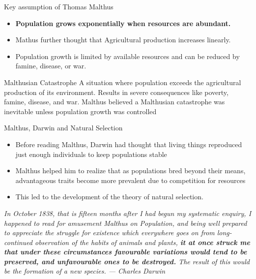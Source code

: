 \begin{frame}{Key assumption of  Thomas Malthus}
\begin{itemize}
    \item \textbf{Population grows exponentially when resources are abundant.}
    \item Mathus further thought that Agricultural production increases linearly.
    \item Population growth is limited by available resources and can be reduced by famine, disease, or war.
\end{itemize}
\vfill
\small

\begin{block}{Malthusian Catastrophe}
A situation where population exceeds the agricultural production of its environment. Results in severe consequences like poverty, famine, disease, and war. Malthus believed a Malthusian catastrophe was inevitable unless population growth was controlled
\end{block}
\end{frame}


\begin{frame}{Malthus, Darwin and Natural Selection }
    \begin{itemize}
        \item Before reading Malthus, Darwin had thought that living things reproduced just enough individuals to keep populations stable
        \item Malthus helped him  to realize that as populations bred beyond their means, advantageous traits become more prevalent due to  competition for resources
        \item This led to the development of the theory of natural selection.
\end{itemize}
\vfill

\footnotesize
\begin{center}
    \textit{In October 1838, that is fifteen months after I had begun my systematic enquiry, I happened to read for amusement Malthus on Population, and being well prepared to appreciate the struggle for existence which everywhere goes on from long-continued observation of the habits of animals and plants, \textbf{it at once struck me that under these circumstances favourable variations would tend to be preserved, and unfavourable ones to be destroyed.} The result of this would be the formation of a new species.
    \newline
    --- Charles Darwin
    }
    
\end{center}
\end{frame}

